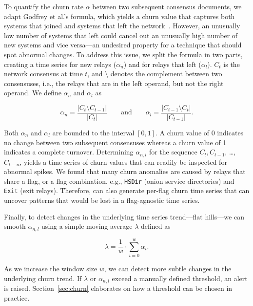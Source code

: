 To quantify the churn rate $\alpha$ between two subsequent consensus documents,
we adapt Godfrey et al.'s formula, which yields a churn value that captures
both systems that joined and systems that left the
network~\cite[\S~2.1]{Godfrey2006a}.  However, an unusually low number of
systems that left could cancel out an unusually high number of new systems and
vice versa---an undesired property for a technique that should spot abnormal
changes.  To address this issue, we split the formula in two parts, creating a
time series for new relays ($\alpha_{n}$) and for relays that left
($\alpha_{l}$).  $C_{t}$ is the network consensus at time $t$, and $\setminus$
denotes the complement between two consensuses, i.e., the relays that are in
the left operand, but not the right operand.  We define $\alpha_{n}$ and
$\alpha_{l}$ as

\begin{equation}
\alpha_{n} = \frac{\lvert C_{t} \setminus C_{t-1} \rvert}
{\lvert C_{t} \rvert}
\qquad\text{and}\qquad
\alpha_{l} = \frac{\lvert C_{t-1} \setminus C_{t} \rvert}
{\lvert C_{t-1} \rvert}.
\end{equation}

Both $\alpha_{n}$ and $\alpha_{l}$ are bounded to the interval $[0, 1]$.  A
churn value of 0 indicates no change between two subsequent consensuses whereas
a churn value of 1 indicates a complete turnover.  Determining $\alpha_{n,l}$
for the sequence $C_{t}, C_{t-1}$, \ldots, $C_{t-n}$, yields a time series of
churn values that can readily be inspected for abnormal spikes.  We found that
many churn anomalies are caused by relays that share a flag, or a flag
combination, e.g., \texttt{HSDir} (onion service directories) and \texttt{Exit}
(exit relays).  Therefore, \sys can also generate per-flag churn time series
that can uncover patterns that would be lost in a flag-agnostic time series.

Finally, to detect changes in the underlying time series trend---flat hills---we
can smooth $\alpha_{n,l}$ using a simple moving average $\lambda$ defined as

\begin{equation}
\lambda = \frac{1}{w} \cdot \sum_{i=0}^{w} \alpha_{i}.
\end{equation}

As we increase the window size $w$, we can detect more subtle changes in the
underlying churn trend.  If $\lambda$ or $\alpha_{n,l}$ exceed a manually
defined threshold, an alert is raised.  Section~\ref{sec:churn} elaborates on
how a threshold can be chosen in practice.

